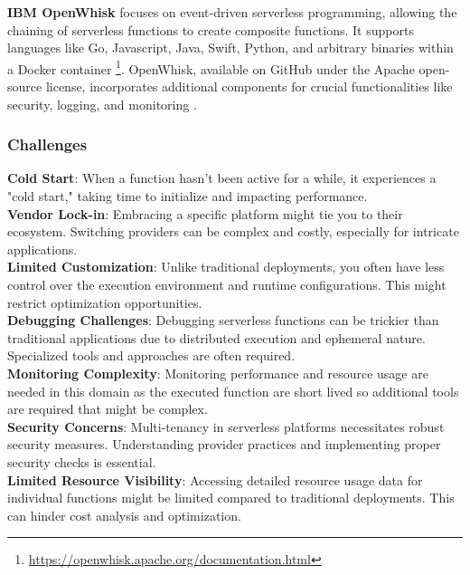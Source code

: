  \textbf{IBM OpenWhisk} focuses on event-driven serverless programming, allowing the chaining of serverless functions to create composite functions. It supports languages like Go, Javascript, Java, Swift, Python, and arbitrary binaries within a Docker container \footnote{\url{https://openwhisk.apache.org/documentation.html}}. OpenWhisk, available on GitHub under the Apache open-source license, incorporates additional components for crucial functionalities like security, logging, and monitoring \cite{Baldini17}.\\

\subsubsection{Challenges}

\textbf{Cold Start}: When a function hasn't been active for a while, it experiences a "cold start," taking time to initialize and impacting performance.\\

\textbf{Vendor Lock-in}: Embracing a specific platform might tie you to their ecosystem. Switching providers can be complex and costly, especially for intricate applications.\\

\textbf{Limited Customization}: Unlike traditional deployments, you often have less control over the execution environment and runtime configurations. This might restrict optimization opportunities.\\

\textbf{Debugging Challenges}: Debugging serverless functions can be trickier than traditional applications due to distributed execution and ephemeral nature. Specialized tools and approaches are often required.\\

\textbf{Monitoring Complexity}: Monitoring performance and resource usage are needed in this domain as the executed function are short lived so additional tools are required that might be complex.\\

\textbf{Security Concerns}: Multi-tenancy in serverless platforms necessitates robust security measures. Understanding provider practices and implementing proper security checks is essential.\\

\textbf{Limited Resource Visibility}: Accessing detailed resource usage data for individual functions might be limited compared to traditional deployments. This can hinder cost analysis and optimization.\\

